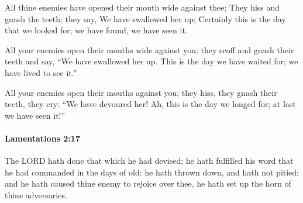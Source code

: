 			\begin{versebox}
					\item[BHS] 
					\item[LXX] 
					\item[ASV] All thine enemies have opened their mouth wide against thee; They hiss and gnash the teeth; they say, We have swallowed her up; Certainly this is the day that we looked for; we have found, we have seen it.
					\item[NIV] All your enemies open their mouths wide against you; they scoff and gnash their teeth and say, “We have swallowed her up. This is the day we have waited for; we have lived to see it.”
					\item[NRSV] All your enemies open their mouths against you; they hiss, they gnash their teeth, they cry: “We have devoured her! Ah, this is the day we longed for; at last we have seen it!”
			\end{versebox}

		\paragraph{Lamentations 2:17} %
			\label{LAMENTATIONS-2-17}

			The LORD hath done that which he had devised; he hath fulfilled his word that he had commanded in the days of old: he hath thrown down, and hath not pitied: and he hath caused thine enemy to rejoice over thee, he hath set up the horn of thine adversaries.

